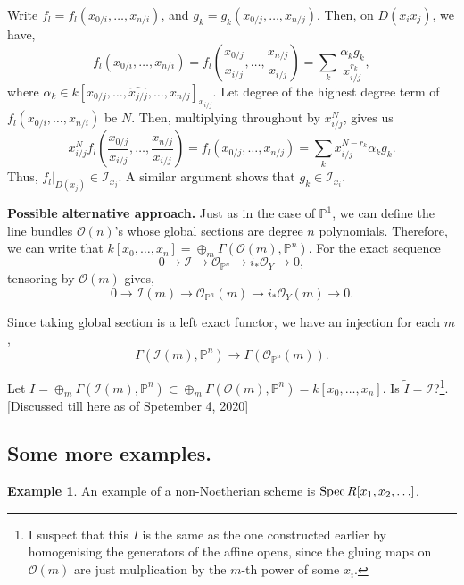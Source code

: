 \documentclass[11pt]{amsart}
\newcommand{\Spec}{{\rm Spec \,}}
\renewcommand{\tilde}{\widetilde}
\newcommand{\sI}{{\mathcal I}}
\newcommand{\sO}{{\mathcal O}}
\renewcommand{\P}{{\mathbb P}}
\theoremstyle{definition}
\newtheorem{example}[theorem]{Example}
\begin{document}
Write $f_l=f_l(x_{0/i},\ldots,x_{n/i})$, and $g_k=g_k(x_{0/j},\ldots,x_{n/j})$. Then, on $D(x_i x_j)$, we have,
\[ f_l(x_{0/i},\ldots,x_{n/i})= f_l(\frac{x_{0/j}}{x_{i/j}}, \ldots,\frac{x_{n/j}}{x_{i/j}})=\sum_k \frac{\alpha_k g_k}{x_{i/j}^{r_k}}, \]
where $\alpha_k\in k[x_{0/j},\ldots,\widehat{x_{j/j}},\ldots,x_{n/j}]_{x_{i/j}}$. Let degree of the highest degree term of $f_l(x_{0/i},\ldots,x_{n/i})$ be $N$. Then, multiplying throughout by $x_{i/j}^N$, gives us
\[x_{i/j}^N f_l(\frac{x_{0/j}}{x_{i/j}},\ldots,\frac{x_{n/j}}{x_{i/j}})= f_l(x_{0/j},\ldots,x_{n/j})=\sum_k  x_{i/j}^{N-r_k} \alpha_k g_k.\]
Thus, $f_l|_{D(x_j)}\in \sI_{x_j}$. A similar argument shows that $g_k\in \sI_{x_i}$.

\noindent\textbf{Possible alternative approach.} Just as in the case of $\P^1$, we can define the line bundles $\sO(n)$'s whose global sections are degree $n$ polynomials. Therefore, we can write that $k[x_0,\ldots,x_n]=\oplus_m\Gamma (\sO(m),\P^n)$. For the exact sequence
\[0\rightarrow \sI\rightarrow \sO_{\P^n}\rightarrow i_*\sO_Y\rightarrow 0,\]
tensoring by $\sO(m)$ gives,
\[0\rightarrow \sI(m)\rightarrow \sO_{\P^n}(m)\rightarrow i_*\sO_Y(m)\rightarrow 0.\]

Since taking global section is a left exact functor, we have an injection for each $m$,
\[\Gamma (\sI(m),\P^n)\rightarrow \Gamma (\sO_{\P^n}(m)).\]

Let $I=\oplus_m \Gamma (\sI(m),\P^n)\subset \oplus_m\Gamma (\sO(m),\P^n) = k[x_0,\ldots,x_n]$. Is $\tilde{I}=\sI$?\footnote{I suspect that this $I$ is the same as the one constructed earlier by homogenising the generators of the affine opens, since the gluing maps on $\sO(m)$ are just mulplication by the $m$-th power of some $x_i$.}. [Discussed till here as of Spetember 4, 2020]

\subsection{Some more examples.}

\begin{example}
An example of a non-Noetherian scheme is $\Spec R[x_1,x_2,\ldots]$. 
\end{example}
\end{document}
